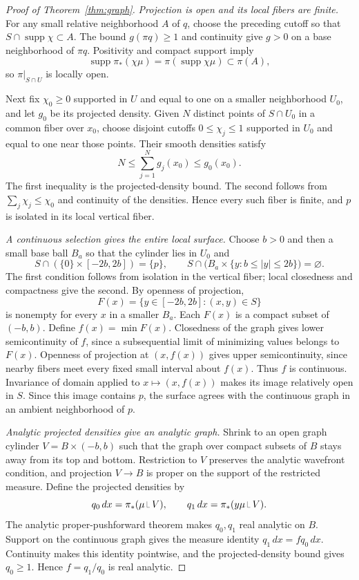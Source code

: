 \documentclass[11pt]{article}
\newcommand{\supp}{\operatorname{supp}}
\newcommand{\restr}{\mathbin{\vrule height 1.4ex depth 0pt width .06ex\vrule height .06ex depth 0pt width .65ex}}
\begin{document}
\begin{proof}[Proof of Theorem~\ref{thm:graph}]
\emph{Projection is open and its local fibers are finite.}
For any small relative neighborhood $A$ of $q$, choose the preceding cutoff so that $S\cap\supp\chi\subset A$. The bound $g(\pi q)\ge1$ and continuity give $g>0$ on a base neighborhood of $\pi q$. Positivity and compact support imply
\[
 \supp\pi_*(\chi\mu)=\pi(\supp\chi\mu)\subset\pi(A),
\]
so $\pi|_{S\cap U}$ is locally open.

Next fix $\chi_0\ge0$ supported in $U$ and equal to one on a smaller neighborhood $U_0$, and let $g_0$ be its projected density. Given $N$ distinct points of $S\cap U_0$ in a common fiber over $x_0$, choose disjoint cutoffs $0\le\chi_j\le1$ supported in $U_0$ and equal to one near those points. Their smooth densities satisfy
\[
 N\le\sum_{j=1}^N g_j(x_0)\le g_0(x_0).
\]
The first inequality is the projected-density bound. The second follows from $\sum_j\chi_j\le\chi_0$ and continuity of the densities. Hence every such fiber is finite, and $p$ is isolated in its local vertical fiber.

\emph{A continuous selection gives the entire local surface.}
Choose $b>0$ and then a small base ball $B_a$ so that the cylinder lies in $U_0$ and
\[
 S\cap(\{0\}\times[-2b,2b])=\{p\},\qquad
 S\cap\bigl(B_a\times\{y:b\le|y|\le2b\}\bigr)=\varnothing.
\]
The first condition follows from isolation in the vertical fiber; local closedness and compactness give the second. By openness of projection,
\[
 F(x)=\{y\in[-2b,2b]:(x,y)\in S\}
\]
is nonempty for every $x$ in a smaller $B_a$. Each $F(x)$ is a compact subset of $(-b,b)$. Define $f(x)=\min F(x)$. Closedness of the graph gives lower semicontinuity of $f$, since a subsequential limit of minimizing values belongs to $F(x)$. Openness of projection at $(x,f(x))$ gives upper semicontinuity, since nearby fibers meet every fixed small interval about $f(x)$. Thus $f$ is continuous. Invariance of domain applied to $x\mapsto(x,f(x))$ makes its image relatively open in $S$. Since this image contains $p$, the surface agrees with the continuous graph in an ambient neighborhood of $p$.

\emph{Analytic projected densities give an analytic graph.}
Shrink to an open graph cylinder $V=B\times(-b,b)$ such that the graph over compact subsets of $B$ stays away from its top and bottom. Restriction to $V$ preserves the analytic wavefront condition, and projection $V\to B$ is proper on the support of the restricted measure. Define the projected densities by
\[
 q_0\,dx=\pi_*(\mu\restr V),\qquad
 q_1\,dx=\pi_*(y\mu\restr V).
\]
The analytic proper-pushforward theorem \cite[Corollary 5.4.10 and Remark 5.4.11]{Schultka} makes $q_0,q_1$ real analytic on $B$. Support on the continuous graph gives the measure identity $q_1\,dx=fq_0\,dx$. Continuity makes this identity pointwise, and the projected-density bound gives $q_0\ge1$. Hence $f=q_1/q_0$ is real analytic.
\end{proof}
\end{document}
